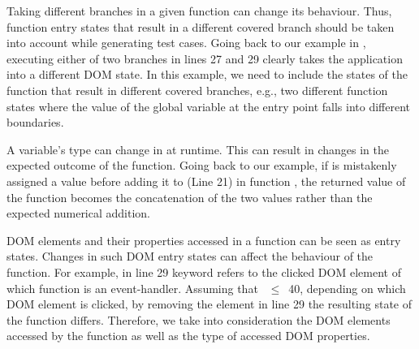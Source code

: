 \begin{description}[noitemsep, leftmargin=0.4cm]
\item[Branch coverage:] Taking different branches in a given function can change its behaviour. Thus, function entry states that result in a different covered branch should be taken into account while generating test cases. Going back to our example in , executing either of two branches in lines 27 and 29 clearly takes the application into a different DOM state. In this example, we need to include the  states of the  function that result in different covered branches, e.g., two different function states where the value of the 
global variable  at the entry point falls into different boundaries.   

\item[Return value type:] A variable's type can change in \javascript at runtime. This can result in changes in the expected outcome of the function. Going back to our example, if  is mistakenly assigned a  value before adding it to  (Line 21) in function , the returned value of the function becomes the  concatenation of the two values rather than the expected numerical addition. 

\item[Accessed DOM properties:] DOM elements and their properties accessed in a function can be seen as entry states. Changes in such DOM entry states can affect the behaviour of the function. For example, in line 29  keyword refers to the clicked DOM element of which function  is an event-handler. Assuming that ~$\leq$~40, depending on which DOM element is clicked, by removing the element in line 29 the resulting state of the function  differs.
Therefore, we take into consideration the DOM elements accessed by the function as well as the type of accessed DOM properties.

\end{description}

